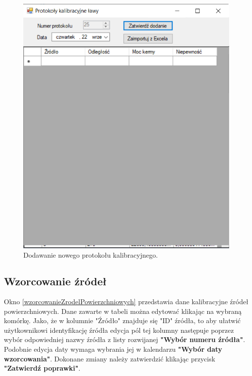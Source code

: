 \begin{figure}[htb]
	\centering
	\includegraphics{obrazki/Ustawienia/protokoly_kalibracyjne_lawy_dodawanie.png}
	\caption{Dodawanie nowego protokołu kalibracyjnego.}
	\label{protokolyKalLawyDodaj}
\end{figure}

\subsection{Wzorcowanie źródeł}
\label{wzor_zrodel}

Okno \ref{wzorcowanieZrodelPowierzchniowych} przedstawia dane kalibracyjne źródeł powierzchniowych. Dane zawarte w tabeli można edytować klikając na wybraną komórkę. Jako, że w kolumnie "Źródło" znajduje się "ID" źródła, to aby ułatwić użytkownikowi identyfikację źródła edycja pól tej kolumny następuje poprzez wybór odpowiedniej nazwy źródła z listy rozwijanej \textbf{"Wybór numeru źródła"}. Podobnie edycja daty wymaga wybrania jej w kalendarzu \textbf{"Wybór daty wzorcowania"}. Dokonane zmiany należy zatwierdzić klikając przycisk \textbf{"Zatwierdź poprawki"}. 

